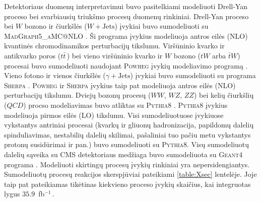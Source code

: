 \documentclass[a4paper, 12pt, oneside]{article}
\newcommand{\ZZ}{Z\! Z}
\newcommand{\WZ}{W\! Z}
\newcommand{\tbarW}{\bar{t}W}
\newcommand{\gJets}{\gamma\! +\!\mathrm{Jets}}
\newcommand{\WJets}{W\! +\!\mathrm{Jets}}
\newcommand{\invfb}{fb$^{-1}\,$}
\newcommand{\QCD}{QC\! D}
\begin{document}
Detektoriaus duomenų interpretavimui buvo pasitelkiami modeliuoti Drell-Yan proceso bei svarbiausių triukšmo
procesų duomenų rinkiniai.
Drell-Yan proceso bei $W$ bozono ir čiurkšlės ($\WJets$) įvykiai buvo sumodeliuoti su
\textsc{MadGraph5\_aMC@NLO} \cite{MG_aMCatNLO}.
Ši programa įvykius modeliuoja antros eilės (NLO) kvantinės chromodinamikos perturbacijų tikslumu.
Viršūninio kvarko ir antikvarko poros ($t\bar{t}\,$) bei vieno viršūninio kvarko ir $W$ bozono ($tW$ arba
$\tbarW$) procesai buvo sumodeliuoti naudojant \textsc{Powheg} įvykių modeliavimo programą \cite{powheg_ttbar, powheg_tW}.
Vieno fotono ir vienos čiurkšlės ($\gJets$) įvykiai buvo sumodeliuoti su programa \textsc{Sherpa} \cite{Sherpa}.
\textsc{Powheg} ir \textsc{Sherpa} įvykius taip pat modeliuoja antros eilės (NLO) perturbacijų tikslumu.
Dviejų bozonų procesų ($WW$, $\WZ$, $\ZZ$) bei kelių čiurkšlių ($\QCD$) procso modeliavimas buvo atliktas su
\textsc{Pythia8} \cite{pythia82}.
\textsc{Pythia8} įvykius modeliuoja pirmos eilės (LO) tikslumu.
Visi sumodeliuotuose įvykiuose vykstantys antriniai procesai (kvarkų ir gliuonų hadronizacija, papildomų dalelių
spinduliavimas, nestabilių dalelių skilimai, pašaliniai tuo pačiu metu vykstantys protonų susidūrimai ir pan.)
buvo sumodeliuoti su \textsc{Pythia8}.
Visų sumodeliuotų dalelių sąveika su CMS detektoriaus medžiaga buvo sumodeliuota su \textsc{Geant4} programa
\cite{geant4}.
Modeliuoti skirtingų procesų įvykių rinkiniai yra nepersidengiantys.
Sumodeliuotų procesų reakcijos skerspjūviai pateikiami \ref{table:Xsec} lentelėje.
Joje taip pat pateikiamas tikėtinas kiekvieno proceso įvykių skaičius, kai integruotas lygus $35.9$~\invfb.
\end{document}
